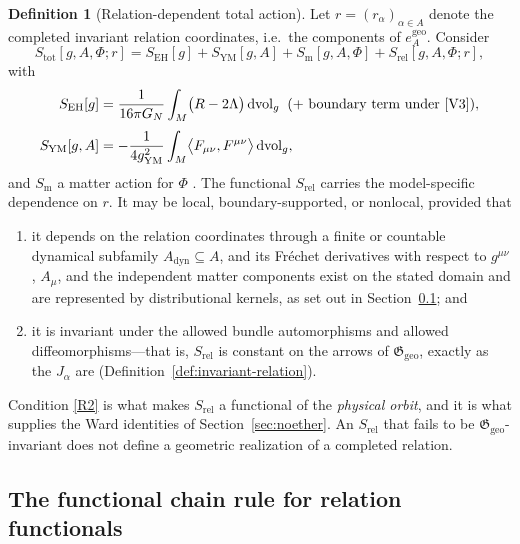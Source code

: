 \documentclass[11pt,a4paper]{article}
\theoremstyle{plain}
\theoremstyle{definition}
\newtheorem{definition}[theorem]{Definition}
\theoremstyle{remark}
\newcommand{\Ggeo}{\mathfrak{G}_{\mathrm{geo}}}
\newcommand{\dvol}{\mathrm{d}\!\operatorname{vol}_g}
\newcommand{\egeo}{e_A^{\mathrm{geo}}}
\begin{document}
\begin{definition}[Relation-dependent total action]
\label{def:action}
Let $r=(r_\alpha)_{\alpha\in A}$ denote the completed invariant relation coordinates, i.e.\ the
components of $\egeo$. Consider
\begin{equation}
\label{eq:Stot}
S_{\mathrm{tot}}[g,A,\Phi;r]
=
S_{\mathrm{EH}}[g]
+S_{\mathrm{YM}}[g,A]
+S_{\mathrm{m}}[g,A,\Phi]
+S_{\mathrm{rel}}[g,A,\Phi;r],
\end{equation}
with
\begin{align}
\label{eq:SEH}
S_{\mathrm{EH}}[g]
&=\frac{1}{16\pi G_N}\int_M \bigl(R-2\Lambda\bigr)\,\dvol
\;\;(+\text{ boundary term under \ref{V3}}),
\\[0.3em]
\label{eq:SYM}
S_{\mathrm{YM}}[g,A]
&=-\frac{1}{4g_{\mathrm{YM}}^{2}}\int_M
\bigl\langle F_{\mu\nu},F^{\mu\nu}\bigr\rangle\,\dvol ,
\end{align}
and $S_{\mathrm{m}}$ a matter action for $\Phi$ \cite{YangMills1954}. The functional
$S_{\mathrm{rel}}$ carries the model-specific dependence on $r$. It may be local,
boundary-supported, or nonlocal, provided that
\begin{enumerate}[label=(R\arabic*),leftmargin=2.8em]
\item\label{R1} it depends on the relation coordinates through a finite or countable dynamical
      subfamily $A_{\mathrm{dyn}}\subseteq A$, and its Fr\'echet derivatives with respect to
      $g^{\mu\nu}$, $A_\mu$, and the independent matter components exist on the stated domain and
      are represented by distributional kernels, as set out in Section~\ref{sec:chain-rule}; and
\item\label{R2} it is invariant under the allowed bundle automorphisms and allowed
      diffeomorphisms---that is, $S_{\mathrm{rel}}$ is constant on the arrows of $\Ggeo$, exactly as
      the $J_\alpha$ are (Definition~\ref{def:invariant-relation}).
\end{enumerate}
\end{definition}

Condition \ref{R2} is what makes $S_{\mathrm{rel}}$ a functional of the \emph{physical orbit}, and it
is what supplies the Ward identities of Section~\ref{sec:noether}. An $S_{\mathrm{rel}}$ that fails to be $\Ggeo$-invariant does not define a geometric realization of
a completed relation.

\subsection{The functional chain rule for relation functionals}
\label{sec:chain-rule}
\end{document}
